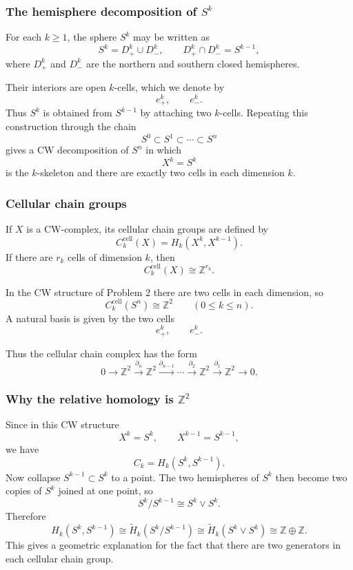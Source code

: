 \documentclass[12pt,a4paper]{article}
\theoremstyle{notespace}
\begin{document}
\subsubsection{The hemisphere decomposition of \(S^k\)}

For each \(k\ge 1\), the sphere \(S^k\) may be written as
\[
S^k=D^k_+\cup D^k_-,
\qquad
D^k_+\cap D^k_-=S^{k-1},
\]
where \(D^k_+\) and \(D^k_-\) are the northern and southern closed hemispheres.

Their interiors are open \(k\)-cells, which we denote by
\[
e_+^k,\qquad e_-^k.
\]
Thus \(S^k\) is obtained from \(S^{k-1}\) by attaching two \(k\)-cells. Repeating this construction through the chain
\[
S^0\subset S^1\subset \cdots \subset S^n
\]
gives a CW decomposition of \(S^n\) in which
\[
X^k=S^k
\]
is the \(k\)-skeleton and there are exactly two cells in each dimension \(k\).

\subsubsection{Cellular chain groups}

If \(X\) is a CW-complex, its cellular chain groups are defined by
\[
C_k^{\mathrm{cell}}(X)=H_k(X^k,X^{k-1}).
\]
If there are \(r_k\) cells of dimension \(k\), then
\[
C_k^{\mathrm{cell}}(X)\cong \mathbb Z^{r_k}.
\]

In the CW structure of Problem 2 there are two cells in each dimension, so
\[
C_k^{\mathrm{cell}}(S^n)\cong \mathbb Z^2
\qquad (0\le k\le n).
\]
A natural basis is given by the two cells
\[
e_+^k,\qquad e_-^k.
\]

Thus the cellular chain complex has the form
\[
0\to \mathbb Z^2 \xrightarrow{\partial_n} \mathbb Z^2 \xrightarrow{\partial_{n-1}} \cdots
\xrightarrow{\partial_2}\mathbb Z^2\xrightarrow{\partial_1}\mathbb Z^2\to 0.
\]

\subsubsection{Why the relative homology is \(\mathbb Z^2\)}

Since in this CW structure
\[
X^k=S^k,\qquad X^{k-1}=S^{k-1},
\]
we have
\[
C_k=H_k(S^k,S^{k-1}).
\]
Now collapse \(S^{k-1}\subset S^k\) to a point. The two hemispheres of \(S^k\) then become two copies of \(S^k\) joined at one point, so
\[
S^k/S^{k-1}\cong S^k\vee S^k.
\]
Therefore
\[
H_k(S^k,S^{k-1})
\cong \widetilde H_k(S^k/S^{k-1})
\cong \widetilde H_k(S^k\vee S^k)
\cong \mathbb Z\oplus \mathbb Z.
\]
This gives a geometric explanation for the fact that there are two generators in each cellular chain group.
\end{document}
